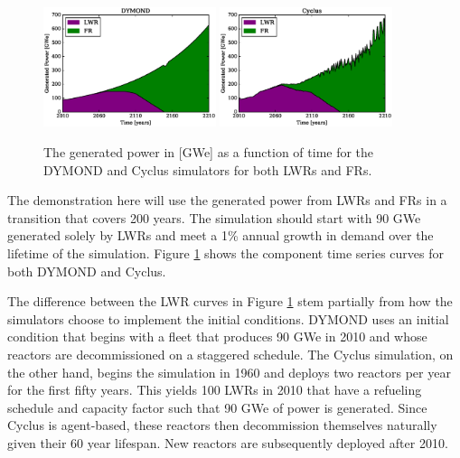 \begin{figure}[htb]
\centering
\includegraphics[width=0.45\textwidth]{gwe-dymond.eps}
\includegraphics[width=0.45\textwidth]{gwe-cyclus.eps}
\caption{The generated power in [GWe] as a function of time for the DYMOND and 
Cyclus simulators for both LWRs and FRs.}
\label{gwe-simulators}
\end{figure}

The demonstration here will use the generated power from LWRs and FRs in 
a transition that covers 200 years. The simulation should start with
90 GWe generated solely by LWRs and meet a 1\% annual growth in demand over the 
lifetime of the simulation. Figure \ref{gwe-simulators} shows the component time 
series curves for both DYMOND and Cyclus. 

The difference between the LWR curves in Figure \ref{gwe-simulators} stem 
partially from how the simulators choose to implement the initial conditions.
DYMOND uses an initial condition that 
begins with a fleet that produces 90 GWe in 2010 and whose reactors are 
decommissioned on a staggered schedule. The Cyclus simulation, on the other 
hand, begins the simulation in 1960 and deploys two reactors per year for
the first fifty years. This yields 100 LWRs in 2010 that have a refueling 
schedule and capacity factor such that 90 GWe of power is generated. Since
Cyclus is agent-based, these reactors then decommission themselves naturally
given their 60 year lifespan. New reactors are subsequently deployed after
2010.

